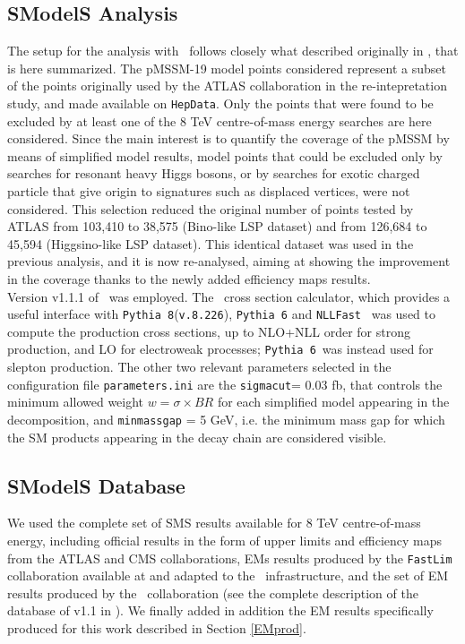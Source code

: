 \documentclass[epj,nopacs,fleqn]{svjour}
\begin{document}
\subsection{SModelS Analysis}
The setup for the analysis with \SMO~follows closely what described originally in \cite{Ambrogi:2017lov}, that is here summarized. The pMSSM-19 model points considered represent a subset of the points originally used by the ATLAS collaboration in the re-intepretation study\cite{Aad:2015baa}, and made available on \texttt{HepData}\cite{ATLASpMSSMhepdata}. Only the points that were found to be excluded by at least one of the 8 TeV centre-of-mass energy searches are here considered. Since the main interest is to quantify the coverage of the pMSSM by means of simplified model results, model points that could be excluded only by searches for resonant heavy Higgs bosons, or by searches for exotic charged particle that give origin to signatures such as displaced vertices, were not considered. 
This selection reduced the original number of points tested by ATLAS from 103,410 to 38,575 (Bino-like LSP dataset) and from 126,684 to 45,594 (Higgsino-like LSP dataset). This identical dataset was used in the previous \SMO analysis, and it is now  re-analysed, aiming at showing the improvement in the coverage thanks to the newly added efficiency maps results. 
\\
Version v1.1.1 of \SMO~was employed. The \SMO~cross section calculator, which provides a useful interface with \texttt{Pythia 8}(\texttt{v.8.226})\cite{Sjostrand:2014zea}, \texttt{Pythia 6}\cite{Sjostrand:2006za} and \texttt{NLLFast}~\cite{nllfast,Beenakker:1996ch,Kulesza:2008jb,Kulesza:2009kq,Beenakker:2009ha,Beenakker:2011fu,Beenakker:1997ut,Beenakker:2010nq} was used to compute the production cross sections, up to NLO+NLL order for strong production, and LO for electroweak processes; \texttt{Pythia 6}~was instead used for slepton production. The other two relevant parameters selected in the configuration file \texttt{parameters.ini} are the \texttt{sigmacut}= 0.03 fb, that controls the  minimum allowed weight  $w = \sigma \times BR$ for each simplified model appearing in the decomposition, and \verb|minmassgap| = 5 GeV, i.e. the minimum mass gap for which the SM products appearing in the decay chain are considered visible. 
\\
\subsection{SModelS Database}
We used the complete set of SMS results available for 8 TeV centre-of-mass energy, including official results in the form of upper limits and efficiency maps from the ATLAS and CMS collaborations, EMs results produced by the \texttt{FastLim} collaboration available at \cite{fastlim:web} and adapted to the \SMO~infrastructure, and the set of EM results produced by the \SMO~collaboration (see the complete description of the database of v1.1 in \cite{Ambrogi:2017lov}). We finally added in addition the EM results specifically produced for this work described in Section \ref{EMprod}.
\end{document}
